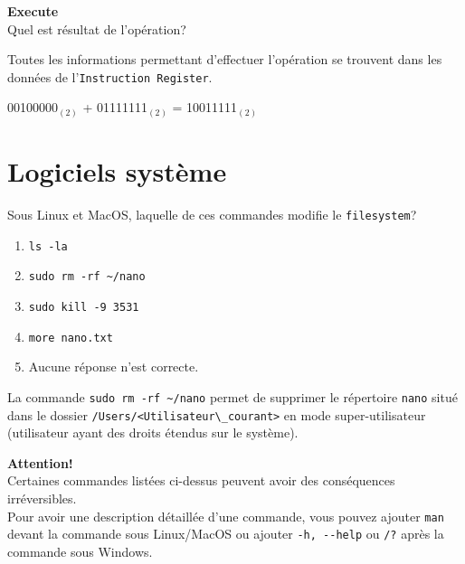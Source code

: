 \begin{Exercice}[5 minutes] \textbf{Execute}\\
    Quel est résultat de l'opération?
\end{Exercice}

   \begin{conseil}
        Toutes les informations permettant d’effectuer l’opération se trouvent dans les données de l’\lstinline{Instruction Register}.
    \end{conseil}

\begin{solution}
    00100000$_{(2)}$ + 01111111$_{(2)}$ = 10011111$_{(2)}$
\end{solution}


\section{Logiciels système}

\begin{Exercice}[5 minutes]
    Sous Linux et MacOS, laquelle de ces commandes modifie le \lstinline{filesystem}?
    \begin{enumerate}
        \item \lstinline{ls -la}
        \item \lstinline{sudo rm -rf ~/nano}
        \item \lstinline{sudo kill -9 3531}
        \item \lstinline{more nano.txt}
        \item Aucune réponse n'est correcte.
    \end{enumerate}
    \begin{solution}
        La commande \lstinline{sudo rm -rf ~/nano} permet de supprimer le répertoire \lstinline{nano} situé dans le dossier \lstinline{/Users/<Utilisateur\_courant>} en mode super-utilisateur (utilisateur ayant des droits étendus sur le système).
    \end{solution}
    \begin{conseil}
        \textbf{Attention!}\\
        Certaines commandes listées ci-dessus peuvent avoir des conséquences irréversibles.\\
        Pour avoir une description détaillée d'une commande, vous pouvez ajouter \lstinline{man} devant la commande sous Linux/MacOS ou ajouter \lstinline{-h, --help} ou \lstinline{/?} après la commande sous Windows.
    \end{conseil}
\end{Exercice}


